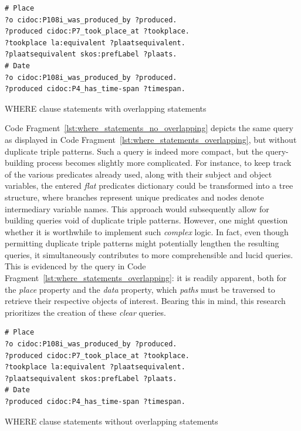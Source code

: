 \begin{listing}[htbp]
    \begin{verbatim}
# Place
?o cidoc:P108i_was_produced_by ?produced.
?produced cidoc:P7_took_place_at ?tookplace.
?tookplace la:equivalent ?plaatsequivalent.
?plaatsequivalent skos:prefLabel ?plaats.
# Date
?o cidoc:P108i_was_produced_by ?produced.
?produced cidoc:P4_has_time-span ?timespan.
    \end{verbatim}
    \caption{WHERE clause statements with overlapping statements}
    \label{lst:where_statements_overlapping}
\end{listing}

Code Fragment~\ref{lst:where_statements_no_overlapping} depicts the same query as displayed in Code Fragment~\ref{lst:where_statements_overlapping}, but without duplicate triple patterns. Such a query is indeed more compact, but the query-building process becomes slightly more complicated. For instance, to keep track of the various predicates already used, along with their subject and object variables, the entered \textit{flat} predicates dictionary could be transformed into a tree structure, where branches represent unique predicates and nodes denote intermediary variable names. This approach would subsequently allow for building queries void of duplicate triple patterns. However, one might question whether it is worthwhile to implement such \textit{complex} logic. In fact, even though permitting duplicate triple patterns might potentially lengthen the resulting queries, it simultaneously contributes to more comprehensible and lucid queries. This is evidenced by the query in Code Fragment~\ref{lst:where_statements_overlapping}: it is readily apparent, both for the \textit{place} property and the \textit{data} property, which \textit{paths} must be traversed to retrieve their respective objects of interest. Bearing this in mind, this research prioritizes the creation of these \textit{clear} queries.

\begin{listing}[htbp]
    \begin{verbatim}
# Place
?o cidoc:P108i_was_produced_by ?produced.
?produced cidoc:P7_took_place_at ?tookplace.
?tookplace la:equivalent ?plaatsequivalent.
?plaatsequivalent skos:prefLabel ?plaats.
# Date
?produced cidoc:P4_has_time-span ?timespan.
    \end{verbatim}
    \caption{WHERE clause statements without overlapping statements}
    \label{lst:where_statements_no_overlapping}
\end{listing}

